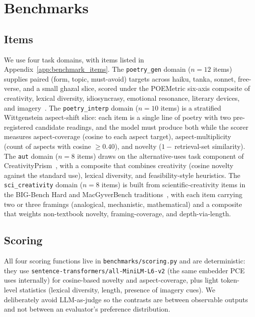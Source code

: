 \section{Benchmarks}\label{sec:benchmarks}

\sloppy

\subsection{Items}

We use four task domains, with items listed in Appendix~\ref{app:benchmark_items}. The \texttt{poetry\_gen} domain ($n=12$ items) supplies paired (form, topic, must-avoid) targets across haiku, tanka, sonnet, free-verse, and a small ghazal slice, scored under the POEMetric six-axis composite of creativity, lexical diversity, idiosyncrasy, emotional resonance, literary devices, and imagery~\citep{Ye2025POEMetric}. The \texttt{poetry\_interp} domain ($n=10$ items) is a stratified Wittgenstein aspect-shift slice: each item is a single line of poetry with two pre-registered candidate readings, and the model must produce both while the scorer measures aspect-coverage (cosine to each aspect target), aspect-multiplicity (count of aspects with cosine ${}\geq 0.40$), and novelty ($1-$\,retrieval-set similarity). The \texttt{aut} domain ($n=8$ items) draws on the alternative-uses task component of CreativityPrism~\citep{CreativityPrism2025}, with a composite that combines creativity (cosine novelty against the standard use), lexical diversity, and feasibility-style heuristics. The \texttt{sci\_creativity} domain ($n=8$ items) is built from scientific-creativity items in the BIG-Bench Hard and MacGyverBench traditions~\citep{suzgun2023bbh,Tian2024MacGyver}, with each item carrying two or three framings (analogical, mechanistic, mathematical) and a composite that weights non-textbook novelty, framing-coverage, and depth-via-length.

\subsection{Scoring}

All four scoring functions live in \texttt{benchmarks/scoring.py} and are deterministic: they use \texttt{sentence-transformers/all-MiniLM-L6-v2} (the same embedder PCE uses internally) for cosine-based novelty and aspect-coverage, plus light token-level statistics (lexical diversity, length, presence of imagery cues). We deliberately avoid LLM-as-judge so the contrasts are between observable outputs and not between an evaluator's preference distribution.

